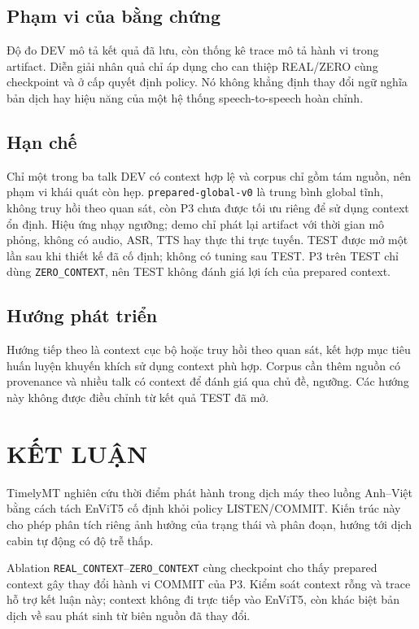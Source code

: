 \documentclass[11pt,a4paper]{article}
\numberwithin{figure}{section}
\numberwithin{table}{section}
\begin{document}
\subsection{Phạm vi của bằng chứng}
Độ đo DEV mô tả kết quả đã lưu, còn thống kê trace mô tả hành vi trong artifact. Diễn giải nhân quả chỉ áp dụng cho can thiệp REAL/ZERO cùng checkpoint và ở cấp quyết định policy. Nó không khẳng định thay đổi ngữ nghĩa bản dịch hay hiệu năng của một hệ thống speech-to-speech hoàn chỉnh.

\subsection{Hạn chế}
Chỉ một trong ba talk DEV có context hợp lệ và corpus chỉ gồm tám nguồn, nên phạm vi khái quát còn hẹp. \texttt{prepared-global-v0} là trung bình global tĩnh, không truy hồi theo quan sát, còn P3 chưa được tối ưu riêng để sử dụng context ổn định. Hiệu ứng nhạy ngưỡng; demo chỉ phát lại artifact với thời gian mô phỏng, không có audio, ASR, TTS hay thực thi trực tuyến. TEST được mở một lần sau khi thiết kế đã cố định; không có tuning sau TEST. P3 trên TEST chỉ dùng \texttt{ZERO\_CONTEXT}, nên TEST không đánh giá lợi ích của prepared context.

\subsection{Hướng phát triển}
Hướng tiếp theo là context cục bộ hoặc truy hồi theo quan sát, kết hợp mục tiêu huấn luyện khuyến khích sử dụng context phù hợp. Corpus cần thêm nguồn có provenance và nhiều talk có context để đánh giá qua chủ đề, ngưỡng. Các hướng này không được điều chỉnh từ kết quả TEST đã mở.

\section{KẾT LUẬN}

TimelyMT nghiên cứu thời điểm phát hành trong dịch máy theo luồng Anh--Việt bằng cách tách EnViT5 cố định khỏi policy LISTEN/COMMIT. Kiến trúc này cho phép phân tích riêng ảnh hưởng của trạng thái và phân đoạn, hướng tới dịch cabin tự động có độ trễ thấp.

Ablation \texttt{REAL\_CONTEXT}--\texttt{ZERO\_CONTEXT} cùng checkpoint cho thấy prepared context gây thay đổi hành vi COMMIT của P3. Kiểm soát context rỗng và trace hỗ trợ kết luận này; context không đi trực tiếp vào EnViT5, còn khác biệt bản dịch về sau phát sinh từ biên nguồn đã thay đổi.
\end{document}
